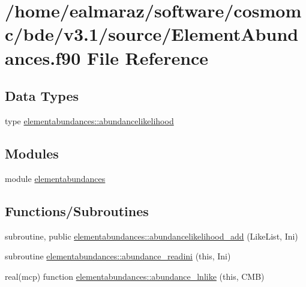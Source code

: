 \hypertarget{ElementAbundances_8f90}{}\section{/home/ealmaraz/software/cosmomc/bde/v3.1/source/\+Element\+Abundances.f90 File Reference}
\label{ElementAbundances_8f90}
\subsection*{Data Types}
\begin{DoxyCompactItemize}
\item 
type \mbox{\hyperlink{structelementabundances_1_1abundancelikelihood}{elementabundances\+::abundancelikelihood}}
\end{DoxyCompactItemize}
\subsection*{Modules}
\begin{DoxyCompactItemize}
\item 
module \mbox{\hyperlink{namespaceelementabundances}{elementabundances}}
\end{DoxyCompactItemize}
\subsection*{Functions/\+Subroutines}
\begin{DoxyCompactItemize}
\item 
subroutine, public \mbox{\hyperlink{namespaceelementabundances_ab38dda4bf7a9aec310c4b1f93a4b51b0}{elementabundances\+::abundancelikelihood\+\_\+add}} (Like\+List, Ini)
\item 
subroutine \mbox{\hyperlink{namespaceelementabundances_a72d18f9f5d0b7db26c7bca022a12e566}{elementabundances\+::abundance\+\_\+readini}} (this, Ini)
\item 
real(mcp) function \mbox{\hyperlink{namespaceelementabundances_af926a0605dc16619d37dee5ad1658bba}{elementabundances\+::abundance\+\_\+lnlike}} (this, C\+MB)
\end{DoxyCompactItemize}
